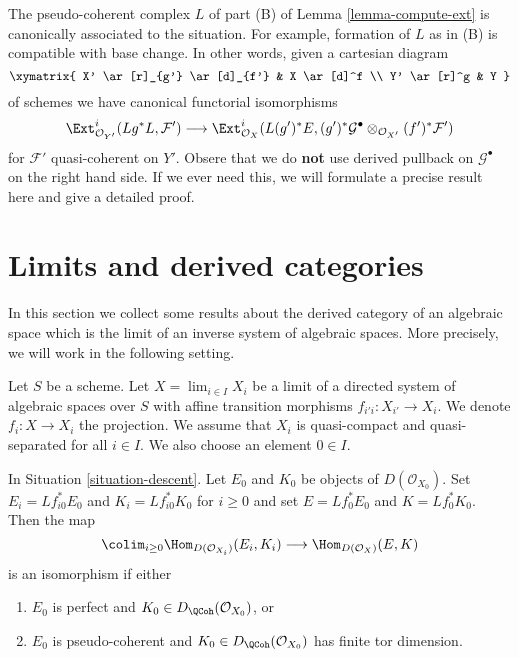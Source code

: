 \begin{remark}
\label{remark-base-change-of-L}
The pseudo-coherent complex $L$ of part (B) of Lemma \ref{lemma-compute-ext}
is canonically associated to the situation. For example,
formation of $L$ as in (B) is compatible with base change.
In other words, given a cartesian diagram
$$
\xymatrix{
X' \ar[r]_{g'} \ar[d]_{f'} &
X \ar[d]^f \\
Y' \ar[r]^g &
Y
}
$$
of schemes we have canonical functorial isomorphisms
$$
\Ext^i_{\mathcal{O}_{Y'}}(Lg^*L, \mathcal{F}') \longrightarrow
\Ext^i_{\mathcal{O}_X}(L(g')^*E,
(g')^*\mathcal{G}^\bullet \otimes_{\mathcal{O}_{X'}} (f')^*\mathcal{F}')
$$
for $\mathcal{F}'$ quasi-coherent on $Y'$. Obsere that we do {\bf not} use
derived pullback on $\mathcal{G}^\bullet$ on the right hand side.
If we ever need this, we will
formulate a precise result here and give a detailed proof.
\end{remark}








\section{Limits and derived categories}
\label{section-limits}

\noindent
In this section we collect some results about the derived category
of an algebraic space which is the limit of an inverse system of
algebraic spaces. More precisely, we will work in the following setting.

\begin{situation}
\label{situation-descent}
Let $S$ be a scheme. Let $X = \lim_{i \in I} X_i$ be a limit of a directed
system of algebraic spaces over $S$ with affine transition morphisms
$f_{i'i} : X_{i'} \to X_i$. We denote $f_i : X \to X_i$ the projection.
We assume that $X_i$ is quasi-compact and quasi-separated for all $i \in I$.
We also choose an element $0 \in I$.
\end{situation}

\begin{lemma}
\label{lemma-descend-homomorphisms}
In Situation \ref{situation-descent}. Let $E_0$ and $K_0$ be objects of
$D(\mathcal{O}_{X_0})$. Set $E_i = Lf_{i0}^*E_0$ and $K_i = Lf_{i0}^*K_0$
for $i \geq 0$ and set $E = Lf_0^*E_0$ and $K = Lf_0^*K_0$. Then the map
$$
\colim_{i \geq 0} \Hom_{D(\mathcal{O}_{X_i})}(E_i, K_i)
\longrightarrow
\Hom_{D(\mathcal{O}_X)}(E, K)
$$
is an isomorphism if either
\begin{enumerate}
\item $E_0$ is perfect and $K_0 \in D_\QCoh(\mathcal{O}_{X_0})$, or
\item $E_0$ is pseudo-coherent and
$K_0 \in D_\QCoh(\mathcal{O}_{X_0})$ has finite tor dimension.
\end{enumerate}
\end{lemma}

